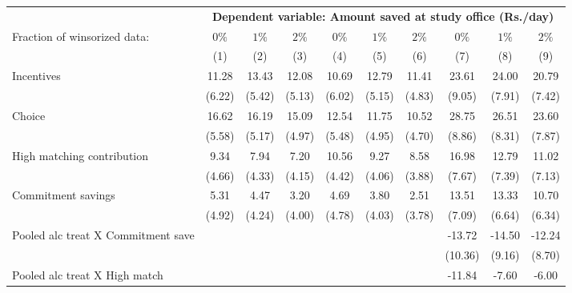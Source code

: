 \begin{tabular}{l c c c c c c c c c} \toprule & \multicolumn{9}{c}{\textbf{Dependent variable: Amount saved at study office (Rs./day)}} \\ \cmidrule(lr){2-10} Fraction of winsorized data: & $0\%$ & $1\%$ & $2\%$ & $0\%$ & $1\%$ & $2\%$ & $0\%$ & $1\%$ & $2\%$ \\&\multicolumn{1}{c}{(1)}&\multicolumn{1}{c}{(2)}&\multicolumn{1}{c}{(3)}&\multicolumn{1}{c}{(4)}&\multicolumn{1}{c}{(5)}&\multicolumn{1}{c}{(6)}&\multicolumn{1}{c}{(7)}&\multicolumn{1}{c}{(8)}&\multicolumn{1}{c}{(9)}\\
\midrule
Incentives          &       11.28&       13.43&       12.08&       10.69&       12.79&       11.41&       23.61&       24.00&       20.79\\
                    &      (6.22)&      (5.42)&      (5.13)&      (6.02)&      (5.15)&      (4.83)&      (9.05)&      (7.91)&      (7.42)\\
\addlinespace
Choice              &       16.62&       16.19&       15.09&       12.54&       11.75&       10.52&       28.75&       26.51&       23.60\\
                    &      (5.58)&      (5.17)&      (4.97)&      (5.48)&      (4.95)&      (4.70)&      (8.86)&      (8.31)&      (7.87)\\
\addlinespace
High matching contribution&        9.34&        7.94&        7.20&       10.56&        9.27&        8.58&       16.98&       12.79&       11.02\\
                    &      (4.66)&      (4.33)&      (4.15)&      (4.42)&      (4.06)&      (3.88)&      (7.67)&      (7.39)&      (7.13)\\
\addlinespace
Commitment savings  &        5.31&        4.47&        3.20&        4.69&        3.80&        2.51&       13.51&       13.33&       10.70\\
                    &      (4.92)&      (4.24)&      (4.00)&      (4.78)&      (4.03)&      (3.78)&      (7.09)&      (6.64)&      (6.34)\\
\addlinespace
Pooled alc treat X Commitment save&            &            &            &            &            &            &      -13.72&      -14.50&      -12.24\\
                    &            &            &            &            &            &            &     (10.36)&      (9.16)&      (8.70)\\
\addlinespace
Pooled alc treat X High match&            &            &            &            &            &            &      -11.84&       -7.60&       -6.00\\

\end{tabular}
